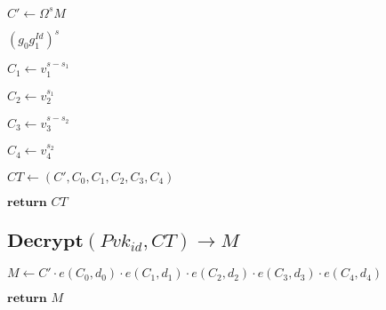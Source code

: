 \documentclass[a4paper]{article}
\begin{document}
$C' \gets \Omega^s M$

$(g_0 g_1^\textit{Id})^s$

$C_1 \gets v_1^{s - s_1}$

$C_2 \gets v_2^{s_1}$

$C_3 \gets v_3^{s - s_2}$

$C_4 \gets v_4^{s_2}$

$\textit{CT} \gets (C', C_0, C_1, C_2, C_3, C_4)$

$\textbf{return }\textit{CT}$

\subsection{$\textbf{Decrypt}(\textit{Pvk}_\textit{id}, \textit{CT}) \rightarrow M$}

$M \gets C' \cdot e(C_0, d_0) \cdot e(C_1, d_1) \cdot e(C_2, d_2) \cdot e(C_3, d_3) \cdot e(C_4, d_4)$

$\textbf{return }M$
\end{document}
